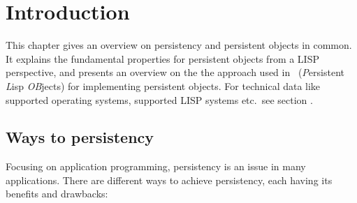 %

\chapter{Introduction}

This chapter gives an overview on persistency and persistent objects
in common.  It explains the fundamental properties for persistent
objects from a LISP perspective, and presents an overview on the the
approach used in \plob\ (\emph{P}ersistent \emph{L}isp \emph{OB}jects)
for implementing persistent objects. For technical data like supported
operating systems, supported LISP systems etc.\ see
section .

\section{Ways to persistency}

Focusing on application programming, persistency is an issue in many
applications. There are different ways to achieve persistency, each
having its benefits and drawbacks:

